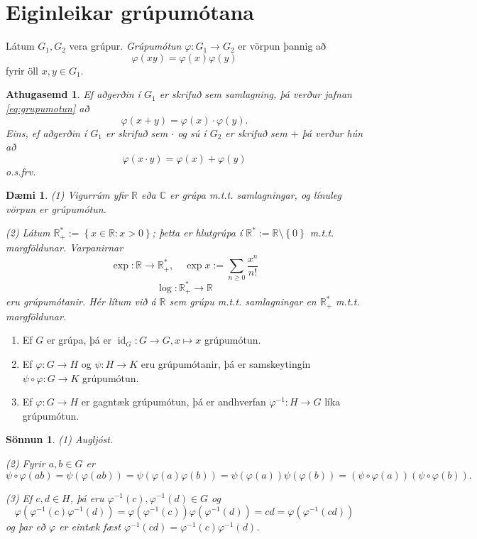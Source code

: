 \documentclass[a4paper,icelandic,11pt]{book}
\theoremstyle{plain}
\newtheorem{daemi}{Dæmi}[chapter]
\newtheorem*{ath}{Athugasemd}
\newtheorem*{sonnun}{Sönnun}
\newcommand{\R}{\mathbb{R}}
\newcommand{\C}{\mathbb{C}}
\DeclareMathOperator{\id}{id} %
\begin{document}
\section{Eiginleikar grúpumótana}
\begin{skilgr}
  Látum $G_1,G_2$ vera grúpur.
  \emph{Grúpumótun}
  $\varphi:G_1\to G_2$ er vörpun þannig að
  \begin{equation}
    \label{eq:grupumotun}
    \varphi(xy) = \varphi(x)\varphi(y) 
  \end{equation}
  fyrir öll $x,y\in G_1$.
\end{skilgr}
\begin{ath}
  Ef aðgerðin í $G_1$ er skrifuð sem samlagning, þá verður jafnan
  \eqref{eq:grupumotun} að 
 \[
 \varphi(x+y) = \varphi(x)\cdot\varphi(y).
 \]
 Eins, ef aðgerðin í $G_1$ er skrifuð sem $\cdot$ og sú í $G_2$ er skrifuð sem
 $+$ þá verður hún að\[
 \varphi(x\cdot y) = \varphi(x)+\varphi(y)
 \]
 o.s.frv.
\end{ath}
\begin{daemi}
 (1) Vigurrúm yfir $\R$ eða $\C$ er grúpa m.t.t. samlagningar, og línuleg
 vörpun er grúpumótun.

 (2) Látum $\R^*_+ := \left\{ x\in\R: x>0 \right\}$; þetta er hlutgrúpa í
 $\R^*:=\R\setminus \left\{ 0 \right\}$ m.t.t. margföldunar. Varpanirnar
 \begin{equation*}
   \exp:\R\to\R^*_+, \quad \exp x := \sum_{n\ge 0}\frac{x^n}{n!}
 \end{equation*}
 \begin{equation*}
   \log: \R^*_+ \to \R
 \end{equation*}
 eru grúpumótanir. Hér lítum við á $\R$ sem grúpu m.t.t. samlagningar en
 $\R^*_+$ m.t.t. margföldunar.
\end{daemi}
\begin{setn}
  \begin{enumerate}[(1)]
    \item Ef $G$ er grúpa, þá er $\id_G:G\to G, x\mapsto x$ grúpumótun.
    \item Ef $\varphi:G\to H$ og $\psi: H\to K$ eru grúpumótanir, þá er
      samskeytingin $\psi\circ\varphi:G\to K$ grúpumótun.
    \item Ef $\varphi: G\to H$ er gagntæk grúpumótun, þá er andhverfan
      $\varphi^{-1}: H\to G$ líka grúpumótun.
  \end{enumerate}
\end{setn}
\begin{sonnun}
  (1) Augljóst.
  
  (2) Fyrir $a,b\in G$ er 
  \[
    \psi\circ\varphi(ab)
    = \psi(\varphi(ab))
    = \psi(\varphi(a)\varphi(b))
    = \psi(\varphi(a))\psi(\varphi(b))
    = (\psi\circ\varphi(a))(\psi\circ\varphi(b)).
  \]
  
  (3) Ef $c,d\in H$, þá eru $\varphi^{-1}(c), \varphi^{-1}(d)\in G$ og 
  \[
    \varphi(\varphi^{-1}(c)\varphi^{-1}(d))
    = \varphi(\varphi^{-1}(c))\varphi(\varphi^{-1}(d))
    = cd
    = \varphi(\varphi^{-1}(cd))
  \]
  og þar eð $\varphi$ er eintæk fæst
  $\varphi^{-1}(cd)=\varphi^{-1}(c)\varphi^{-1}(d)$.
\end{sonnun}
\end{document}
